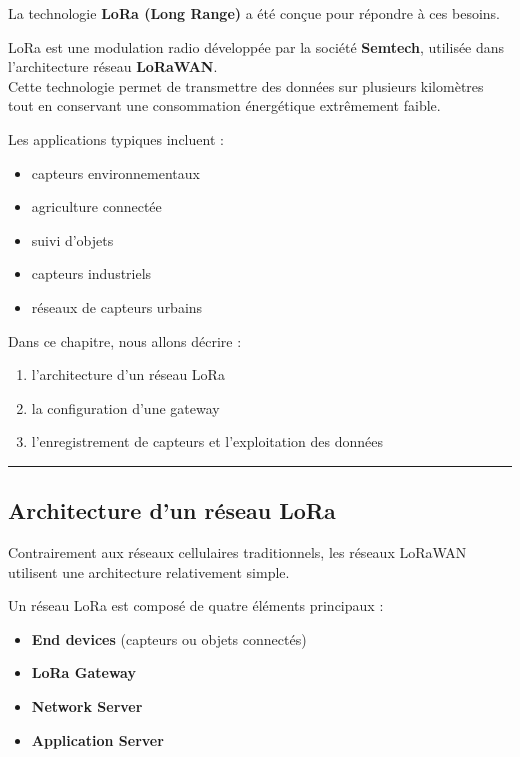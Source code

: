 \documentclass[
  french,
]{article}
\providecommand{\tightlist}{%
  \setlength{\itemsep}{0pt}\setlength{\parskip}{0pt}}
\begin{document}
La technologie \textbf{LoRa (Long Range)} a été conçue pour répondre à
ces besoins.

LoRa est une modulation radio développée par la société
\textbf{Semtech}, utilisée dans l'architecture réseau
\textbf{LoRaWAN}.\\
Cette technologie permet de transmettre des données sur plusieurs
kilomètres tout en conservant une consommation énergétique extrêmement
faible.

Les applications typiques incluent :

\begin{itemize}
\tightlist
\item
  capteurs environnementaux
\item
  agriculture connectée
\item
  suivi d'objets
\item
  capteurs industriels
\item
  réseaux de capteurs urbains
\end{itemize}

Dans ce chapitre, nous allons décrire :

\begin{enumerate}
\def\labelenumi{\arabic{enumi}.}
\tightlist
\item
  l'architecture d'un réseau LoRa
\item
  la configuration d'une gateway
\item
  l'enregistrement de capteurs et l'exploitation des données
\end{enumerate}

\begin{center}\rule{0.5\linewidth}{0.5pt}\end{center}

\subsection{Architecture d'un réseau
LoRa}\label{architecture-dun-ruxe9seau-lora}

Contrairement aux réseaux cellulaires traditionnels, les réseaux LoRaWAN
utilisent une architecture relativement simple.

Un réseau LoRa est composé de quatre éléments principaux :

\begin{itemize}
\tightlist
\item
  \textbf{End devices} (capteurs ou objets connectés)
\item
  \textbf{LoRa Gateway}
\item
  \textbf{Network Server}
\item
  \textbf{Application Server}
\end{itemize}
\end{document}

